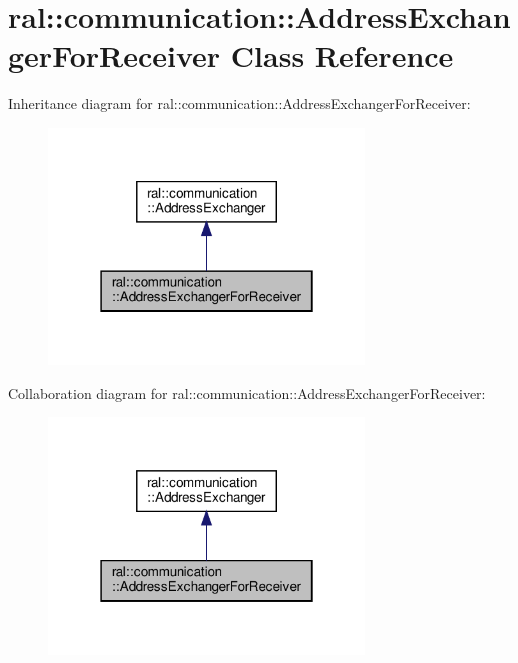 \hypertarget{classral_1_1communication_1_1AddressExchangerForReceiver}{}\section{ral\+:\+:communication\+:\+:Address\+Exchanger\+For\+Receiver Class Reference}
\label{classral_1_1communication_1_1AddressExchangerForReceiver}


Inheritance diagram for ral\+:\+:communication\+:\+:Address\+Exchanger\+For\+Receiver\+:\nopagebreak
\begin{figure}[H]
\begin{center}
\leavevmode
\includegraphics[width=238pt]{classral_1_1communication_1_1AddressExchangerForReceiver__inherit__graph}
\end{center}
\end{figure}


Collaboration diagram for ral\+:\+:communication\+:\+:Address\+Exchanger\+For\+Receiver\+:\nopagebreak
\begin{figure}[H]
\begin{center}
\leavevmode
\includegraphics[width=238pt]{classral_1_1communication_1_1AddressExchangerForReceiver__coll__graph}
\end{center}
\end{figure}
